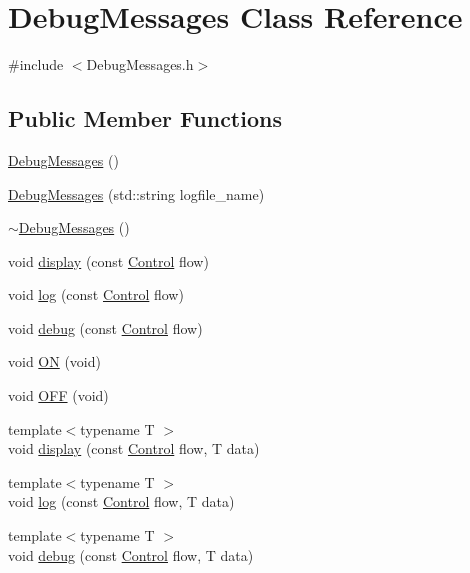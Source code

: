 \hypertarget{class_debug_messages}{}\section{Debug\+Messages Class Reference}
\label{class_debug_messages}


{\ttfamily \#include $<$Debug\+Messages.\+h$>$}

\subsection*{Public Member Functions}
\begin{DoxyCompactItemize}
\item 
\mbox{\hyperlink{class_debug_messages_a7fb2c5a7cce97eb05661b1f6657cb650}{Debug\+Messages}} ()
\item 
\mbox{\hyperlink{class_debug_messages_aa60430ca0e05e43a8bb27f4cdc1a158c}{Debug\+Messages}} (std\+::string logfile\+\_\+name)
\item 
\mbox{\hyperlink{class_debug_messages_a3700e476ad70d27ba14be67b43ff6f69}{$\sim$\+Debug\+Messages}} ()
\item 
void \mbox{\hyperlink{class_debug_messages_a9a73bcf5d8298fd68b55a28c0878e852}{display}} (const \mbox{\hyperlink{_debug_messages_8h_a0da83e35f29c11f7f3c637234f2149f9}{Control}} flow)
\item 
void \mbox{\hyperlink{class_debug_messages_a802f7d26dedc412f06bfe0957415bfd4}{log}} (const \mbox{\hyperlink{_debug_messages_8h_a0da83e35f29c11f7f3c637234f2149f9}{Control}} flow)
\item 
void \mbox{\hyperlink{class_debug_messages_a5cd8aa8eb917f7da19484adc2c7e31a2}{debug}} (const \mbox{\hyperlink{_debug_messages_8h_a0da83e35f29c11f7f3c637234f2149f9}{Control}} flow)
\item 
void \mbox{\hyperlink{class_debug_messages_a95866775dcf301773daa7bed529c557e}{ON}} (void)
\item 
void \mbox{\hyperlink{class_debug_messages_ac1e4085ade0d1ff7b603fd8205f74b7c}{O\+FF}} (void)
\item 
{\footnotesize template$<$typename T $>$ }\\void \mbox{\hyperlink{class_debug_messages_ae9e335acbae42f1c8c97e03d4d588a8f}{display}} (const \mbox{\hyperlink{_debug_messages_8h_a0da83e35f29c11f7f3c637234f2149f9}{Control}} flow, T data)
\item 
{\footnotesize template$<$typename T $>$ }\\void \mbox{\hyperlink{class_debug_messages_accb5bd318d0b085aa1824ddd7b1bd31e}{log}} (const \mbox{\hyperlink{_debug_messages_8h_a0da83e35f29c11f7f3c637234f2149f9}{Control}} flow, T data)
\item 
{\footnotesize template$<$typename T $>$ }\\void \mbox{\hyperlink{class_debug_messages_a49564f4a501f15317f26c360d0bfdb90}{debug}} (const \mbox{\hyperlink{_debug_messages_8h_a0da83e35f29c11f7f3c637234f2149f9}{Control}} flow, T data)
\end{DoxyCompactItemize}
